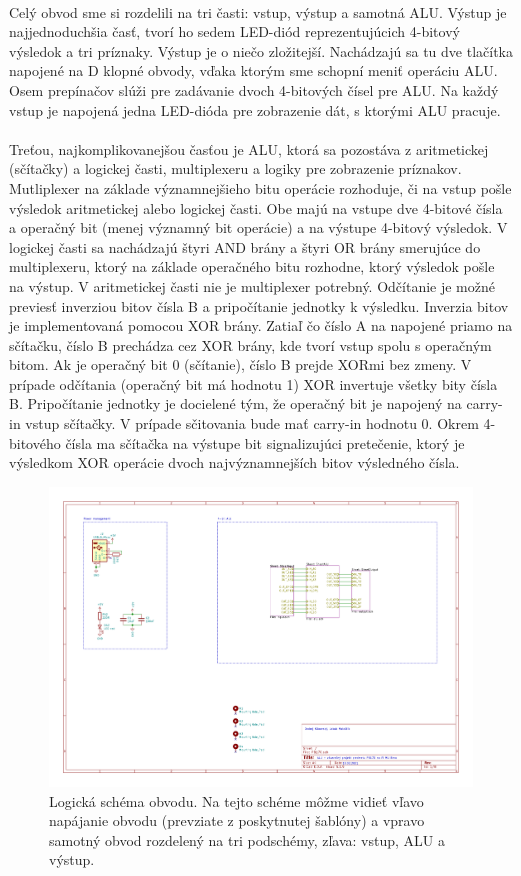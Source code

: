 \documentclass{article}
\begin{document}
    \paragraph{}
    Celý obvod sme si rozdelili na tri časti: vstup, výstup a samotná ALU. Výstup je najjednoduchšia časť, tvorí ho sedem LED-diód reprezentujúcich 4-bitový výsledok a tri príznaky. Výstup je o niečo zložitejší. Nachádzajú sa tu dve tlačítka napojené na D klopné obvody, vďaka ktorým sme schopní meniť operáciu ALU. Osem prepínačov slúži pre zadávanie dvoch 4-bitových čísel pre ALU. Na každý vstup je napojená jedna LED-dióda pre zobrazenie dát, s ktorými ALU pracuje.
    \paragraph{}
    Treťou, najkomplikovanejšou časťou je ALU, ktorá sa pozostáva z aritmetickej (sčítačky) a logickej časti, multiplexeru a logiky pre zobrazenie príznakov. Mutliplexer na základe významnejšieho bitu operácie rozhoduje, či na vstup pošle výsledok aritmetickej alebo logickej časti. Obe majú na vstupe dve 4-bitové čísla a operačný bit (menej významný bit operácie) a na výstupe 4-bitový výsledok. V logickej časti sa nachádzajú štyri AND brány a štyri OR brány smerujúce do multiplexeru, ktorý na základe operačného bitu rozhodne, ktorý výsledok pošle na výstup. V aritmetickej časti nie je multiplexer potrebný. Odčítanie je možné previesť inverziou bitov čísla B a pripočítanie jednotky k výsledku. Inverzia bitov je implementovaná pomocou XOR brány. Zatiaľ čo číslo A na napojené priamo na sčítačku, číslo B prechádza cez XOR brány, kde tvorí vstup spolu s operačným bitom. Ak je operačný bit 0 (sčítanie), číslo B prejde XORmi bez zmeny. V prípade odčítania (operačný bit má hodnotu 1) XOR invertuje všetky bity čísla B. Pripočítanie jednotky je docielené tým, že operačný bit je napojený na carry-in vstup sčítačky. V prípade sčitovania bude mať carry-in hodnotu 0. Okrem 4-bitového čísla ma sčítačka na výstupe bit signalizujúci pretečenie, ktorý je výsledkom XOR operácie dvoch najvýznamnejších bitov výsledného čísla.

    \begin{figure}[h!]
        \centering
        \includegraphics[width=.8\linewidth]{top_sheet.pdf}
        \caption{Logická schéma obvodu. Na tejto schéme môžme vidieť vľavo napájanie obvodu (prevziate z poskytnutej šablóny) a vpravo samotný obvod rozdelený na tri podschémy, zľava: vstup, ALU a výstup.}
    \end{figure}
\end{document}
